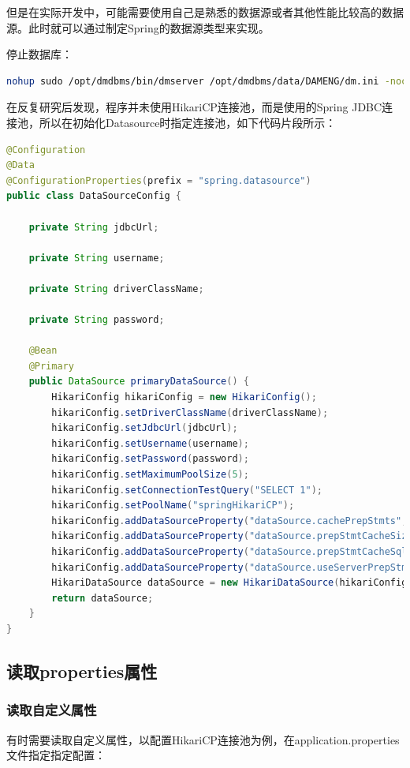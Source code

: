 \documentclass[letter]{book}
\begin{document}
但是在实际开发中，可能需要使用自己是熟悉的数据源或者其他性能比较高的数据源。此时就可以通过制定Spring的数据源类型来实现。

停止数据库：

\begin{lstlisting}[language=Bash]
nohup sudo /opt/dmdbms/bin/dmserver /opt/dmdbms/data/DAMENG/dm.ini -noconsole &
\end{lstlisting}

在反复研究后发现，程序并未使用HikariCP连接池，而是使用的Spring JDBC连接池，所以在初始化Datasource时指定连接池，如下代码片段所示：

\begin{lstlisting}[language=Java]
@Configuration
@Data
@ConfigurationProperties(prefix = "spring.datasource")
public class DataSourceConfig {

	private String jdbcUrl;
	
	private String username;
	
	private String driverClassName;
	
	private String password;
	
	@Bean
	@Primary
	public DataSource primaryDataSource() {
		HikariConfig hikariConfig = new HikariConfig();
		hikariConfig.setDriverClassName(driverClassName);
		hikariConfig.setJdbcUrl(jdbcUrl);
		hikariConfig.setUsername(username);
		hikariConfig.setPassword(password);
		hikariConfig.setMaximumPoolSize(5);
		hikariConfig.setConnectionTestQuery("SELECT 1");
		hikariConfig.setPoolName("springHikariCP");
		hikariConfig.addDataSourceProperty("dataSource.cachePrepStmts", "true");
		hikariConfig.addDataSourceProperty("dataSource.prepStmtCacheSize", "250");
		hikariConfig.addDataSourceProperty("dataSource.prepStmtCacheSqlLimit", "2048");
		hikariConfig.addDataSourceProperty("dataSource.useServerPrepStmts", "true");
		HikariDataSource dataSource = new HikariDataSource(hikariConfig);
		return dataSource;
	}
}
\end{lstlisting}

\subsection{读取properties属性}

\subsubsection{读取自定义属性}

有时需要读取自定义属性，以配置HikariCP连接池为例，在application.properties文件指定指定配置：
\end{document}
